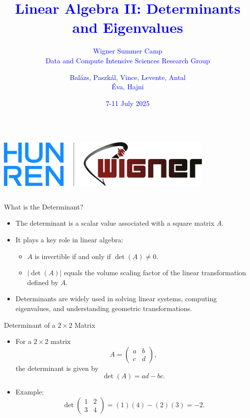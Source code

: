 \documentclass{beamer}
\title{\textcolor{blue}{Linear Algebra II: Determinants and Eigenvalues}}
\subtitle{\textcolor{blue}{Wigner Summer Camp \\ Data and Compute Intensive Sciences Research Group}}
\author{\textcolor{blue}{Balázs, Paszkál, Vince, Levente, Antal \\ Éva, Hajni}}
\date{\textcolor{blue}{7-11 July 2025}}
\begin{document}
	\begin{frame}
		\titlepage
		\begin{columns}
			\centering
			\centering
			\includegraphics[width=0.8\textwidth]{../img/logo.png}
			\centering
		\end{columns}
	\end{frame}

	\begin{frame}{What is the Determinant?}
		\begin{itemize}
		  \item The determinant is a scalar value associated with a square matrix \( A \).
		  \item It plays a key role in linear algebra:
		  \begin{itemize}
		    \item \( A \) is invertible if and only if \( \det(A) \neq 0 \).
		    \item \( |\det(A)| \) equals the volume scaling factor of the linear transformation defined by \( A \).
		  \end{itemize}
		  \item Determinants are widely used in solving linear systems, computing eigenvalues, and understanding geometric transformations.
		\end{itemize}
	\end{frame}

	\begin{frame}{Determinant of a \(2 \times 2\) Matrix}
		\begin{itemize}
		  \item For a \(2 \times 2\) matrix
		  \begin{equation}
		    A =
		    \begin{pmatrix} a & b \\ c & d \end{pmatrix},
		  \end{equation}
		  the determinant is given by
		  \begin{equation}
		    \det(A) = ad - bc. \label{eq:det2x2}
		  \end{equation}
		  \item Example:
		  \begin{equation}
		    \det
		    \begin{pmatrix} 1 & 2 \\ 3 & 4 \end{pmatrix} =
		    (1)(4) - (2)(3) = -2. \label{eq:det2x2_example}
		  \end{equation}
		\end{itemize}
	\end{frame}
\end{document}
